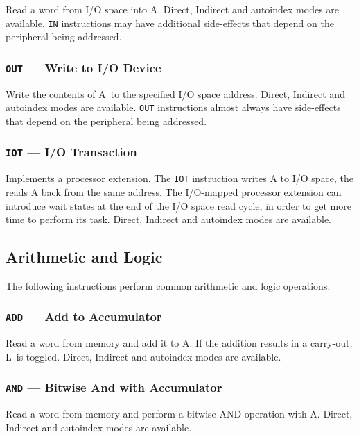 \documentclass[11pt,a4paper,twocolumns]{article}
\newcommand\register[1]{\textsf{#1}}
\newcommand\A{\register{A}}
\newcommand\Lreg{\register{L}}
\begin{document}
Read a word from I/O space into \A. Direct, Indirect and autoindex
modes are available. {\tt IN} instructions may have additional
side-effects that depend on the peripheral being addressed.

\subsubsection{{\tt OUT} — Write to I/O Device}
\label{sec-out}

Write the contents of \A\ to the specified I/O space address. Direct,
Indirect and autoindex modes are available. {\tt OUT} instructions
almost always have side-effects that depend on the peripheral being
addressed.

\subsubsection{{\tt IOT} — I/O Transaction}
\label{sec-iot}

Implements a processor extension. The {\tt IOT} instruction writes A
to I/O space, the reads A back from the same address. The I/O-mapped
processor extension can introduce wait states at the end of the I/O
space read cycle, in order to get more time to perform its
task. Direct, Indirect and autoindex modes are available.

\subsection{Arithmetic and Logic}

The following instructions perform common arithmetic and logic operations.

\subsubsection{{\tt ADD} — Add to Accumulator}
\label{sec-add}

Read a word from memory and add it to \A. If the addition results in a
carry-out, \Lreg\  is toggled. Direct, Indirect and autoindex modes are
available.

\subsubsection{{\tt AND} — Bitwise And with Accumulator}
\label{sec-and}

Read a word from memory and perform a bitwise AND operation with A. Direct, Indirect and autoindex
modes are available.
\end{document}
